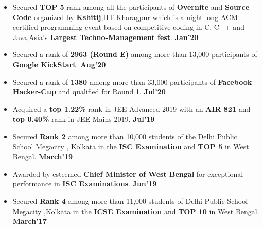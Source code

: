 \documentclass[10pt]{article}
\begin{document}
\spacedhrule{0.15ex}{1.0ex}
\begin{itemize}[leftmargin=*]
\item Secured \textbf{ TOP 5} rank  among all the participants of \textbf{Overnite} and \textbf{Source Code} organized by \textbf{Kshitij},IIT Kharagpur which is a night long ACM certified programming event based on competitive
coding in C, C++ and Java,Asia’s \textbf{Largest Techno-Management fest}.
{\hfill}\textbf{Jan'20}\\[-1.8em]
\item Secured a rank of \textbf{2963 (Round E)} among more than 13,000 participants of \textbf{Google KickStart}. {\hfill}\textbf{Aug'20}\\[-1.8em]
\item Secured a rank of \textbf{ 1380} among more than 33,000 participants of \textbf{Facebook Hacker-Cup} and qualified for Round 1. {\hfill}\textbf{Jul'20}\\[-1.8em]
\item Acquired a \textbf{top 1.22\%} rank in JEE Advanced-2019 with an  \textbf{AIR 821} and \textbf{top 0.40\%} rank in JEE Mains-2019. \href{https://github.com/yashica-patodia/Resume/blob/master/Credentials/Class10_ICSE.jpg} {\hspace{0.5ex}\footnotesize\faMousePointer} {\hfill}\textbf{Jul'19}\\[-1.8em]
\item Secured \textbf{ Rank 2} among more than 10,000 students of the Delhi Public School Megacity , Kolkata in the \textbf{ISC  Examination} and \textbf{TOP 5} in West Bengal.  {\hfill}\textbf{March'19}\\[-1.8em]
\item Awarded by esteemed \textbf{Chief Minister of West Bengal} for exceptional performance in \textbf{ISC Examinations}. 
\href{https://github.com/yashica-patodia/Resume/blob/master/Credentials/Class10_ICSE.jpg} {\hspace{0.5ex}\footnotesize\faMousePointer} {\hfill}\textbf{Jun'19}\\[-1.8em]
\item Secured \textbf{ Rank 4} among more than 11,000  students of Delhi Public School Megacity ,Kolkata in the \textbf{ICSE Examination} and \textbf{TOP 10} in West Bengal.
{\hfill}\textbf{March'17}\\[-1.8em]

\end{itemize}
\end{document}
